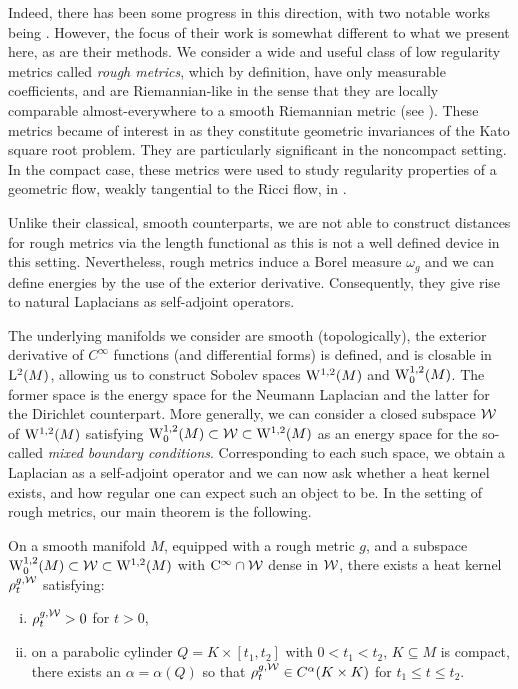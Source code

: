 \documentclass[a4paper, 12pt]{amsart}
\begin{document}
Indeed, there has been some progress in this direction,
with two notable works being \cite{Norris, ERS}.
However, the focus of their work is somewhat different to 
what we present here, as are their methods.
We consider a wide and useful class of 
low regularity metrics called \emph{rough metrics}, 
which by definition, have only measurable coefficients, and are Riemannian-like in the sense
that they are locally comparable almost-everywhere to a smooth Riemannian metric (see ).
These metrics became of interest in \cite{BMc, BRough} as they constitute geometric invariances of the Kato square
root problem. They are particularly significant in the noncompact setting.  
In the compact case, these metrics were used to study regularity properties
of a geometric flow, weakly tangential to the Ricci flow, 
in \cite{BLM, BCont}.

Unlike their classical, smooth counterparts, we are not able
to construct distances for rough metrics via the length functional as 
this is not a well defined device in this setting.
Nevertheless, rough metrics induce a Borel measure $\omega_g$ and we can define energies by the use 
of the exterior derivative. Consequently,  they give rise to natural Laplacians as self-adjoint operators.

The underlying manifolds we consider are smooth (topologically), 
the exterior derivative of \(C^{\infty}\) functions (and  differential forms)
 is defined, and is closable 
in $\Lp{2}(M)$, allowing us to construct Sobolev spaces $\SobH{1}(M)$
and $\SobH[0]{1}(M)$. The
former space is the energy space for the Neumann Laplacian
and the latter for the Dirichlet counterpart.
More generally, we can consider a closed subspace $\cW$ of $\SobH{1}(M)$
satisfying $\SobH[0]{1}(M) \subset \cW \subset \SobH{1}(M)$
as an energy space for the so-called \emph{mixed boundary conditions}. 
Corresponding to each such space, we obtain a Laplacian
as a self-adjoint operator and we can now ask
whether a heat kernel exists, and how regular one
can expect such an object to be. In the setting of rough metrics, our main theorem
is the following. 

\begin{thm}
\label{Thm:Main}
On a smooth manifold \(M\), equipped with a rough metric \(g\), 
and a subspace $\SobH[0]{1}(M) \subset \cW \subset \SobH{1}(M)$
with $\Ck{\infty} \intersect \cW$ dense in $\cW$, 
there exists a heat kernel \(\hk_t^{g,\cW}\) satisfying:  
\begin{enumerate}[(i)] 
\item \(\hk_t^{g,\cW} > 0\) for \(t > 0\),
\item on a parabolic cylinder \(Q = K \times [t_1, t_2]\) with \(0 < t_1 < t_2\), \(K \subseteq M\) is compact, there exists an \(\alpha = \alpha(Q)\) so that \(\hk_t^{g,\cW} \in C^{\alpha}(K \times K)\) for \(t_1 \leq t \leq t_2\).
\end{enumerate}
\end{thm}
\end{document}
